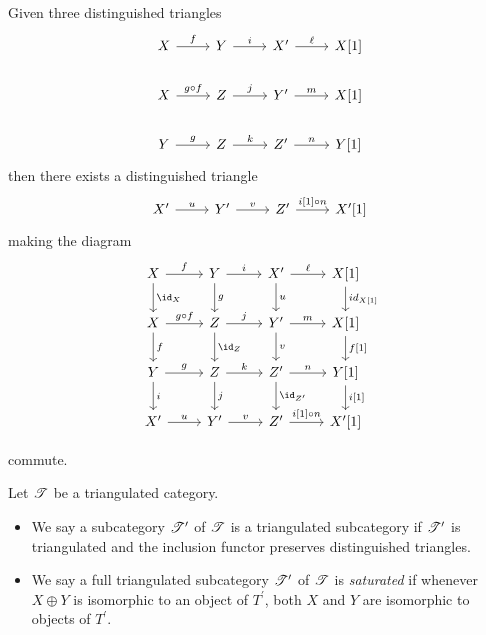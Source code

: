 \documentclass[10pt]{amsart}
\begin{document}
\begin{defn}
\begin{description}[style=nextline]
    \item[TR4]\label{TR4}
      Given three distinguished triangles
      $$\begin{tikzcd}
        X \arrow{r}{f} & Y \arrow{r}{i} & X^\prime \arrow{r}{\ell} & X[1]\\
        X \arrow{r}{g \circ f} & Z \arrow{r}{j} & Y^\prime \arrow{r}{m} & X[1]\\
        Y \arrow{r}{g} & Z \arrow{r}{k} & Z^\prime \arrow{r}{n} & Y[1]
      \end{tikzcd}$$
      then there exists a distinguished triangle
      $$\begin{tikzcd}
        X^\prime \arrow{r}{u} & Y^\prime \arrow{r}{v} & Z^\prime \arrow{r}{i[1]\circ n} & X^\prime[1]
      \end{tikzcd}$$
      making the diagram
      $$\begin{tikzcd}
        X\arrow{d}{\id_X}\arrow{r}{f} & Y\arrow{r}{i}\arrow{d}{g} & X^\prime\arrow{r}{\ell}\arrow{d}{u} & X[1]\arrow{d}{id_{X[1]}}\\
        X \arrow{d}{f}\arrow{r}{g \circ f} & Z\arrow{r}{j}\arrow{d}{\id_Z} & Y^\prime\arrow{r}{m}\arrow{d}{v} & X[1]\arrow{d}{f[1]}\\
        Y\arrow{r}{g}\arrow{d}{i} & Z \arrow{r}{k}\arrow{d}{j} & Z^\prime \arrow{r}{n}\arrow{d}{\id_{Z^\prime}} & Y[1]\arrow{d}{i[1]}\\
        X^\prime \arrow{r}{u} & Y^\prime \arrow{r}{v} & Z^\prime \arrow{r}{i[1] \circ n} & X^\prime[1]
      \end{tikzcd}$$
  \end{description}
\end{defn}
commute.

\begin{defn}
  Let $\mathscr{T}$ be a triangulated category.
  \begin{itemize}
  \item
    We say a subcategory $\mathscr{T}^\prime$ of $\mathscr{T}$ is a triangulated subcategory if $\mathscr{T}^\prime$ is triangulated and the inclusion functor preserves distinguished triangles.
  \item
    We say a full triangulated subcategory $\mathscr{T}^\prime$ of $\mathscr{T}$ is {\it saturated} if whenever $X \oplus Y$ is isomorphic to an object of $T^\prime$, both $X$ and $Y$ are isomorphic to objects of $T^\prime$.
  \end{itemize}
\end{defn}
\end{document}
